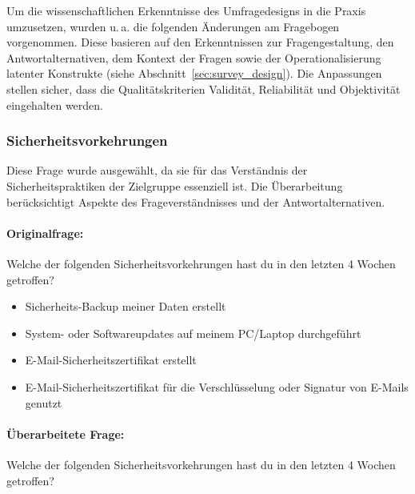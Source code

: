 \documentclass[german,report]{i1thesis}
\begin{document}
Um die wissenschaftlichen Erkenntnisse des Umfragedesigns in die Praxis umzusetzen, wurden u.\,a. die folgenden Änderungen am Fragebogen vorgenommen. Diese basieren auf den Erkenntnissen zur Fragengestaltung, den Antwortalternativen, dem Kontext der Fragen sowie der Operationalisierung latenter Konstrukte (siehe Abschnitt~\ref{sec:survey_design}). Die Anpassungen stellen sicher, dass die Qualitätskriterien Validität, Reliabilität und Objektivität eingehalten werden.

\subsubsection{Sicherheitsvorkehrungen}

Diese Frage wurde ausgewählt, da sie für das Verständnis der Sicherheitspraktiken der Zielgruppe essenziell ist. Die Überarbeitung berücksichtigt Aspekte des Frageverständnisses und der Antwortalternativen.

\paragraph{Originalfrage:}

Welche der folgenden Sicherheitsvorkehrungen hast du in den letzten 4 Wochen getroffen?

\begin{itemize}
    \item Sicherheits-Backup meiner Daten erstellt
    \item System- oder Softwareupdates auf meinem PC/Laptop durchgeführt
    \item E-Mail-Sicherheitszertifikat erstellt
    \item E-Mail-Sicherheitszertifikat für die Verschlüsselung oder Signatur von E-Mails genutzt
\end{itemize}

\paragraph{Überarbeitete Frage:}

Welche der folgenden Sicherheitsvorkehrungen hast du in den letzten 4 Wochen getroffen?
\end{document}
